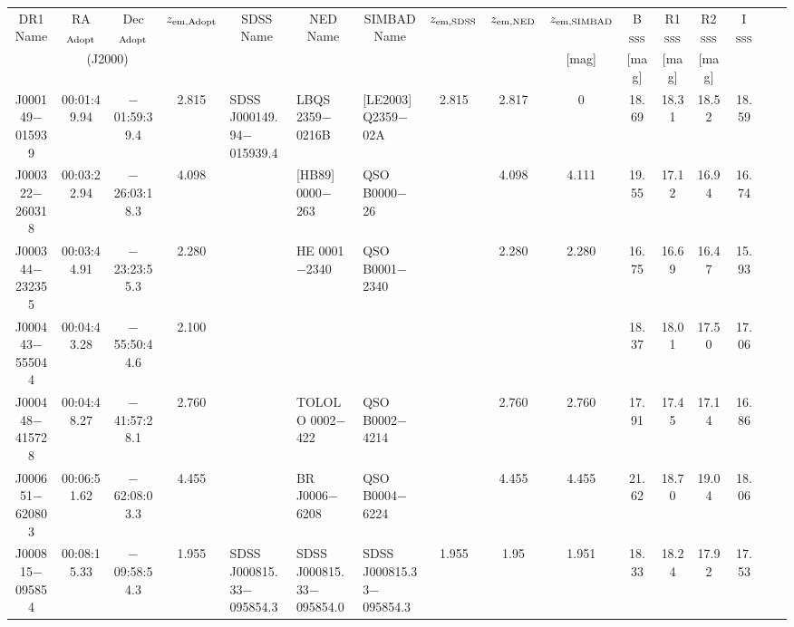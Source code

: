 {\footnotesize
\begin{tabular}{cccclllccccccccc}
\hline
  \multicolumn{1}{c}{DR1 Name} &
  \multicolumn{1}{c}{RA$_{\rm Adopt}$} &
  \multicolumn{1}{c}{Dec$_{\rm Adopt}$} &
  \multicolumn{1}{c}{$z_{\rm em,Adopt}$} &
  \multicolumn{1}{c}{SDSS Name} &
  \multicolumn{1}{c}{NED Name} &
  \multicolumn{1}{c}{SIMBAD Name} &
  \multicolumn{1}{c}{$z_{\rm em,SDSS}$} &
  \multicolumn{1}{c}{$z_{\rm em,NED}$} &
  \multicolumn{1}{c}{$z_{\rm em,SIMBAD}$} &
  \multicolumn{1}{c}{B$_{\rm SSS}$} &
  \multicolumn{1}{c}{R1$_{\rm SSS}$} &
  \multicolumn{1}{c}{R2$_{\rm SSS}$} &
  \multicolumn{1}{c}{I$_{\rm SSS}$} \\
  &
  \multicolumn{2}{c}{(J2000)} &
  &
  &
  &
  &
  &
  &
  \multicolumn{1}{c}{[mag]} &
  \multicolumn{1}{c}{[mag]} &
  \multicolumn{1}{c}{[mag]} &
  \multicolumn{1}{c}{[mag]} \\
\hline
  J000149$-$015939 & 00:01:49.94 & $-$01:59:39.4 & 2.815 & SDSS J000149.94$-$015939.4 & LBQS 2359$-$0216B          & [LE2003] Q2359$-$02A       & 2.815 & 2.817 & 0     & 18.69 & 18.31 & 18.52 & 18.59 \\
  J000322$-$260318 & 00:03:22.94 & $-$26:03:18.3 & 4.098 &                            & [HB89] 0000$-$263          & QSO B0000$-$26             &       & 4.098 & 4.111 & 19.55 & 17.12 & 16.94 & 16.74 \\
  J000344$-$232355 & 00:03:44.91 & $-$23:23:55.3 & 2.280 &                            & HE 0001$-$2340             & QSO B0001$-$2340           &       & 2.280 & 2.280 & 16.75 & 16.69 & 16.47 & 15.93 \\
  J000443$-$555044 & 00:04:43.28 & $-$55:50:44.6 & 2.100 &                            &                            &                            &       &       &       & 18.37 & 18.01 & 17.50 & 17.06 \\
  J000448$-$415728 & 00:04:48.27 & $-$41:57:28.1 & 2.760 &                            & TOLOLO 0002$-$422          & QSO B0002$-$4214           &       & 2.760 & 2.760 & 17.91 & 17.45 & 17.14 & 16.86 \\
  J000651$-$620803 & 00:06:51.62 & $-$62:08:03.3 & 4.455 &                            & BR J0006$-$6208            & QSO B0004$-$6224           &       & 4.455 & 4.455 & 21.62 & 18.70 & 19.04 & 18.06 \\
  J000815$-$095854 & 00:08:15.33 & $-$09:58:54.3 & 1.955 & SDSS J000815.33$-$095854.3 & SDSS J000815.33$-$095854.0 & SDSS J000815.33$-$095854.3 & 1.955 & 1.95  & 1.951 & 18.33 & 18.24 & 17.92 & 17.53 \\

\end{tabular}}
